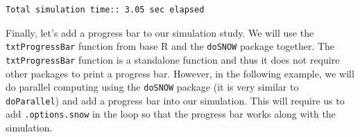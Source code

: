 \documentclass[
]{book}
\newenvironment{Shaded}{\begin{snugshade}}{\end{snugshade}}
\newcommand{\CommentTok}[1]{\textcolor[rgb]{0.56,0.35,0.01}{\textit{#1}}}
\newcommand{\ControlFlowTok}[1]{\textcolor[rgb]{0.13,0.29,0.53}{\textbf{#1}}}
\newcommand{\DataTypeTok}[1]{\textcolor[rgb]{0.13,0.29,0.53}{#1}}
\newcommand{\DecValTok}[1]{\textcolor[rgb]{0.00,0.00,0.81}{#1}}
\newcommand{\KeywordTok}[1]{\textcolor[rgb]{0.13,0.29,0.53}{\textbf{#1}}}
\newcommand{\NormalTok}[1]{#1}
\newcommand{\StringTok}[1]{\textcolor[rgb]{0.31,0.60,0.02}{#1}}
\begin{document}
\begin{verbatim}
Total simulation time:: 3.05 sec elapsed
\end{verbatim}

Finally, let's add a progress bar to our simulation study. We will use the \texttt{txtProgressBar} function from base R and the \texttt{doSNOW} package \citep{R-doSNOW} together. The \texttt{txtProgressBar} function is a standalone function and thus it does not require other packages to print a progress bar. However, in the following example, we will do parallel computing using the \texttt{doSNOW} package (it is very similar to \texttt{doParallel}) and add a progress bar into our simulation. This will require us to add \texttt{.options.snow} in the loop so that the progress bar works along with the simulation.

\begin{Shaded}
\end{Shaded}
\end{document}
